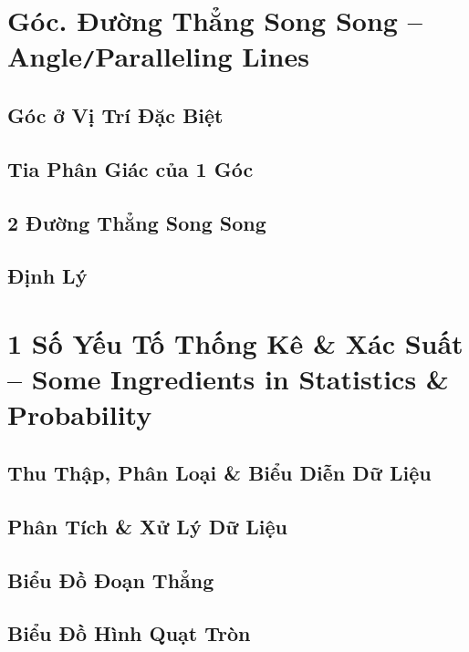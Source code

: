 \documentclass[oneside]{book}
\numberwithin{equation}{section}
\begin{document}

\chapter{Góc. Đường Thẳng Song Song -- Angle\texttt{/}Paralleling Lines}

\section{Góc ở Vị Trí Đặc Biệt}

\section{Tia Phân Giác của 1 Góc}

\section{2 Đường Thẳng Song Song}

\section{Định Lý}


\chapter{1 Số Yếu Tố Thống Kê \& Xác Suất -- Some Ingredients in Statistics \& Probability}

\section{Thu Thập, Phân Loại \& Biểu Diễn Dữ Liệu}

\section{Phân Tích \& Xử Lý Dữ Liệu}

\section{Biểu Đồ Đoạn Thẳng}

\section{Biểu Đồ Hình Quạt Tròn}
\end{document}
